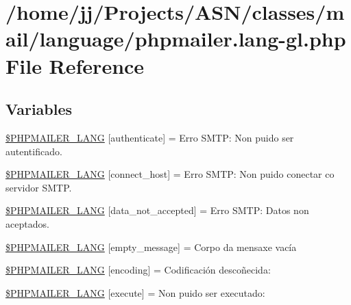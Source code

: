 \hypertarget{phpmailer_8lang-gl_8php}{}\section{/home/jj/\+Projects/\+A\+S\+N/classes/mail/language/phpmailer.lang-\/gl.php File Reference}
\label{phpmailer_8lang-gl_8php}
\subsection*{Variables}
\begin{DoxyCompactItemize}
\item 
\hyperlink{phpmailer_8lang-gl_8php_a2cb33073c989b85580748e331ed8b4aa}{\$\+P\+H\+P\+M\+A\+I\+L\+E\+R\+\_\+\+L\+A\+NG} \mbox{[}\textquotesingle{}authenticate\textquotesingle{}\mbox{]} = \textquotesingle{}Erro S\+M\+T\+P\+: Non puido ser autentificado.\textquotesingle{}
\item 
\hyperlink{phpmailer_8lang-gl_8php_a2ee0cc637a06b96e45600db31c6799ee}{\$\+P\+H\+P\+M\+A\+I\+L\+E\+R\+\_\+\+L\+A\+NG} \mbox{[}\textquotesingle{}connect\+\_\+host\textquotesingle{}\mbox{]} = \textquotesingle{}Erro S\+M\+T\+P\+: Non puido conectar co servidor S\+M\+T\+P.\textquotesingle{}
\item 
\hyperlink{phpmailer_8lang-gl_8php_a814c6b191205d2361b3233e9c9d6fda5}{\$\+P\+H\+P\+M\+A\+I\+L\+E\+R\+\_\+\+L\+A\+NG} \mbox{[}\textquotesingle{}data\+\_\+not\+\_\+accepted\textquotesingle{}\mbox{]} = \textquotesingle{}Erro S\+M\+T\+P\+: Datos non aceptados.\textquotesingle{}
\item 
\hyperlink{phpmailer_8lang-gl_8php_a33772099f637c9d6c2cd7425e0e37fed}{\$\+P\+H\+P\+M\+A\+I\+L\+E\+R\+\_\+\+L\+A\+NG} \mbox{[}\textquotesingle{}empty\+\_\+message\textquotesingle{}\mbox{]} = \textquotesingle{}Corpo da mensaxe vacía\textquotesingle{}
\item 
\hyperlink{phpmailer_8lang-gl_8php_a817f7283f3d54c970a0c10305cc668cc}{\$\+P\+H\+P\+M\+A\+I\+L\+E\+R\+\_\+\+L\+A\+NG} \mbox{[}\textquotesingle{}encoding\textquotesingle{}\mbox{]} = \textquotesingle{}Codificación descoñecida\+: \textquotesingle{}
\item 
\hyperlink{phpmailer_8lang-gl_8php_a668217a9563a168f30f2a8548b6ed5a9}{\$\+P\+H\+P\+M\+A\+I\+L\+E\+R\+\_\+\+L\+A\+NG} \mbox{[}\textquotesingle{}execute\textquotesingle{}\mbox{]} = \textquotesingle{}Non puido ser executado\+: \textquotesingle{}

\end{DoxyCompactItemize}
